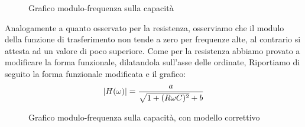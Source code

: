 \documentclass[letterpaper,12pt]{article}
\DeclarePairedDelimiter\abs{\lvert}{\rvert}     %
\begin{document}

\begin{figure}[h!]
    \centering
    \caption{Grafico modulo-frequenza sulla capacità}
    \label{fig:RC_C_modulo}
\end{figure}

Analogamente a quanto osservato per la resistenza, osserviamo che il modulo della funzione di trasferimento non tende a zero per frequenze alte, al contrario si attesta ad un valore di poco superiore. Come per la resistenza abbiamo provato a modificare la forma funzionale, dilatandola sull'asse delle ordinate, Riportiamo di seguito la forma funzionale modificata e il grafico:
\newpage
\begin{equation}
    \label{eq:Modulo RC(capacità) correttivo}
    \abs{H(\omega)} = \frac{a}{\sqrt{1+(R\omega C)^2}+b}
\end{equation}


\begin{figure}[h!]
    \centering
    \caption{Grafico modulo-frequenza sulla capacità, con modello correttivo}
    \label{fig:RC_C_modulo_correzione}
\end{figure}
\end{document}

